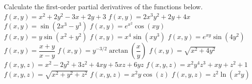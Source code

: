 \fi

\ifcalculus
\begin{Exercise} Calculate the first-order partial derivatives of the functions below.
    \Question[difficulty=1] $f(x,y) = x^2+2y^2-3x+2y+3$
    \Question[difficulty=1] $f(x,y) = 2x^3y^2+2y+4x$
    \Question[difficulty=1] $f(x,y) = \sin\left(2x^3-y^3\right)$
    \Question[difficulty=2] $f(x,y) = e^{x^2}\cos(xy)$
    \Question[difficulty=2] $f(x,y) = y\sin\left(x^2+y^2\right)$
    \Question[difficulty=2] $f(x,y) = x^4\sin\left(xy^3\right)$
    \Question[difficulty=2] $f(x,y) = e^{xy}\sin\left(4y^2\right)$
    \Question[difficulty=2] $f(x,y) = \dfrac{x+y}{x-y}$
    \Question[difficulty=3] $f(x,y) = y^{-3/2}\arctan\left(\dfrac{x}{y}\right)$
    \Question[difficulty=1] $f(x,y) = \sqrt{x^2+4y^2}$
    \Question[difficulty=1] $f(x,y,z) = x^2-2y^2+3z^2+4xy+5xz+6yz$
    \Question[difficulty=1] $f(x,y,z) = x^2y^4z^3+xy+z^2+1$
    \Question[difficulty=1] $f(x,y,z) = \sqrt{x^2+y^2+z^2}$
    \Question[difficulty=1] $f(x,y,z) = x^2y\cos(z)$
    \Question[difficulty=2] $f(x,y,z) = z^2\ln(x^2y)$
\end{Exercise}

